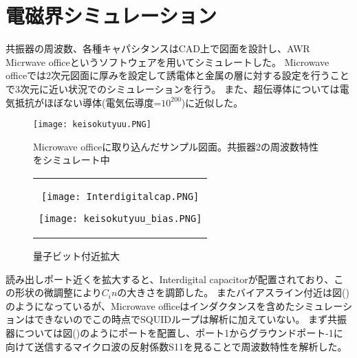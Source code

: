 \section{電磁界シミュレーション}共振器の周波数、各種キャパシタンスはCAD上で図面を設計し、AWR Micrwave officeというソフトウェアを用いてシミュレートした。
Microwave officeでは2次元図面に厚みを設定して誘電体と金属の層に対する設定を行うことで3次元に近い状況でのシミュレーションを行う。
また、超伝導体については電気抵抗がほぼない導体(電気伝導度=$10^{200}$)に近似した。\\
\begin{figure}[H]
    \begin{center}
        \texttt{[image: keisokutyuu.PNG]}
        \caption{Microwave officeに取り込んだサンプル図面。共振器2の周波数特性をシミュレート中}
    \end{center}
\end{figure}
\begin{figure}[H]
    \begin{center}
        \begin{tabular}{c}
            \begin{minipage}{0.5\hsize}
                \begin{center}
                    \texttt{[image: Interdigitalcap.PNG]}
                \end{center}
                \caption{Interdigital capacitor}
            \end{minipage}
            
            \begin{minipage}{0.5\hsize}
                \begin{center}
                    \texttt{[image: keisokutyuu\_bias.PNG]}
                \end{center}
                \caption{量子ビット付近拡大}
            \end{minipage}
        \end{tabular}
    \end{center}
\end{figure}
読み出しポート近くを拡大すると、Interdigital capacitorが配置されており、この形状の微調整により$C_in$の大きさを調節した。
またバイアスライン付近は図()のようになっているが、Microwave officeはインダクタンスを含めたシミュレーションはできないのでこの時点でSQUIDループは解析に加えていない。
まず共振器については図()のようにポートを配置し、ポート1からグラウンドポート-1に向けて送信するマイクロ波の反射係数S11を見ることで周波数特性を解析した。
